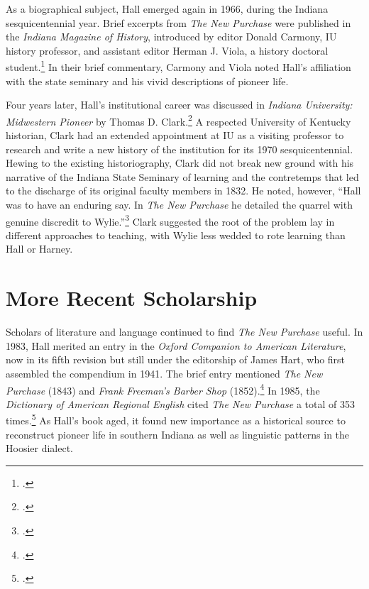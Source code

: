\documentclass[
  american,
  letterpaper,
]{scrreprt}
\begin{document}
As a biographical subject, Hall emerged again in 1966, during the
Indiana sesquicentennial year. Brief excerpts from \emph{The New
Purchase} were published in the \emph{Indiana Magazine of History},
introduced by editor Donald Carmony, IU history professor, and assistant
editor Herman J. Viola, a history doctoral student.\footnote{.} In their brief
commentary, Carmony and Viola noted Hall's affiliation with the state
seminary and his vivid descriptions of pioneer life.

Four years later, Hall's institutional career was discussed in
\emph{Indiana University: Midwestern Pioneer} by Thomas D.
Clark.\footnote{.} A respected
University of Kentucky historian, Clark had an extended appointment at
IU as a visiting professor to research and write a new history of the
institution for its 1970 sesquicentennial. Hewing to the existing
historiography, Clark did not break new ground with his narrative of the
Indiana State Seminary of learning and the contretemps that led to the
discharge of its original faculty members in 1832. He noted, however,
``Hall was to have an enduring say. In \emph{The New Purchase} he
detailed the quarrel with genuine discredit to Wylie.''\footnote{.} Clark suggested the root of the problem lay in different
approaches to teaching, with Wylie less wedded to rote learning than
Hall or Harney.

\section{More Recent Scholarship}\label{more-recent-scholarship}

Scholars of literature and language continued to find \emph{The New
Purchase} useful. In 1983, Hall merited an entry in the \emph{Oxford
Companion to American Literature}, now in its fifth revision but still
under the editorship of James Hart, who first assembled the compendium
in 1941. The brief entry mentioned \emph{The New Purchase} (1843) and
\emph{Frank Freeman's Barber Shop} (1852).\footnote{.} In
1985, the \emph{Dictionary of American Regional English} cited \emph{The
New Purchase} a total of 353 times.\footnote{.} As
Hall's book aged, it found new importance as a historical source to
reconstruct pioneer life in southern Indiana as well as linguistic
patterns in the Hoosier dialect.
\end{document}
